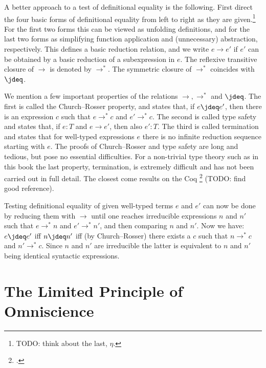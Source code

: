 A better approach to a test of definitional equality is the following.
First direct the four basic forms of definitional equality from left to right
as they are given.\footnote{%
TODO: think about the last, $\eta$.}
For the first two forms this can be viewed as unfolding definitions,
and for the last two forms as simplifying function application and (unnecessary) 
abstraction, respectively.
This defines a basic reduction relation, and we write $e\to e'$ if $e'$ can
be obtained by a basic reduction of a subexpression in $e$. 
The reflexive transitive closure of $\to$ is denoted by $\to^*$.
The symmetric closure of $\to^*$ coincides with $\jdeq$.

We mention a few important properties of the relations $\to,\to^*$ and $\jdeq$.
The first is called the Church--Rosser property, and states that,
if $e\jdeq e'$, then there is an expression $c$ such that $e\to^* c$
and $e'\to^* c$. The second is called type safety and states that,
if $e:T$ and $e\to e'$, then also $e':T$.
The third is called termination and states that for well-typed expressions $e$
there is no infinite reduction sequence starting with $e$.
The proofs of Church--Rosser and type safety are long and tedious, but pose no essential
difficulties. For a non-trivial type theory such as in this book the last property,
termination, is extremely difficult and has not been carried out in full detail.
The closest come results on the Coq \footcite{Coq} (TODO: find good reference).

Testing definitional equality of given well-typed terms $e$ and $e'$ can now be done
by reducing them with $\to$ until one reaches irreducible expressions $n$ and $n'$
such that $e\to^* n$ and $e'\to^* n'$, and then comparing $n$ and $n'$. 
Now we have: $e\jdeq e'$ iff $n\jdeq n'$ iff (by Church--Rosser)
there exists a $c$ such that $n\to^* c$ and $n'\to^* c$.
Since $n$ and $n'$ are irreducible the latter is equivalent to
$n$ and $n'$ being identical syntactic expressions.

\section{The Limited Principle of Omniscience}
\label{sec:LPO}

